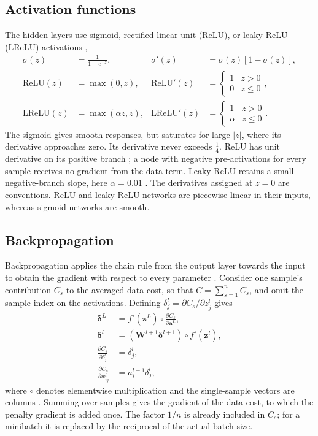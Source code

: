 \documentclass[aps,prb,reprint,superscriptaddress,nofootinbib,longbibliography,floatfix]{revtex4-2}
\begin{document}
\subsection{Activation functions}\label{sec:activation}
The hidden layers use sigmoid, rectified linear unit (ReLU), or leaky ReLU (LReLU) activations \cite[Sec.~8.6]{HjorthJensen2026},
\begin{align}
\sigma(z)&=\frac{1}{1+e^{-z}},
&\sigma'(z)&=\sigma(z)[1-\sigma(z)],\nonumber\\
\mathrm{ReLU}(z)&=\max(0,z),
&\mathrm{ReLU}'(z)&=\begin{cases}1&z>0\\0&z\le0\end{cases},\nonumber\\
\mathrm{LReLU}(z)&=\max(\alpha z,z),
&\mathrm{LReLU}'(z)&=\begin{cases}1&z>0\\\alpha&z\le0\end{cases}.
\label{eq:activations}
\end{align}
The sigmoid gives smooth responses, but saturates for large $|z|$, where its derivative approaches zero. Its derivative never exceeds $\frac14$. ReLU has unit derivative on its positive branch \cite{Nair2010}; a node with negative pre-activations for every sample receives no gradient from the data term. Leaky ReLU retains a small negative-branch slope, here $\alpha=0.01$ \cite{Maas2013}. The derivatives assigned at $z=0$ are conventions. ReLU and leaky ReLU networks are piecewise linear in their inputs, whereas sigmoid networks are smooth.

\subsection{Backpropagation}\label{sec:backprop}
Backpropagation applies the chain rule from the output layer towards the input to obtain the gradient with respect to every parameter \cite[Sec.~8.8]{HjorthJensen2026}. Consider one sample's contribution $C_s$ to the averaged data cost, so that $C=\sum_{s=1}^n C_s$, and omit the sample index on the activations. Defining $\delta_j^l=\partial C_s/\partial z_j^l$ gives
\begin{align}
\bm\delta^L&=f'\!\left(\bm z^L\right)\circ
\frac{\partial C_s}{\partial\bm a^L},\label{eq:bp1}\\
\bm\delta^l&=\left(\bm W^{l+1}\bm\delta^{l+1}\right)
\circ f'\!\left(\bm z^l\right),\label{eq:bp2}\\
\frac{\partial C_s}{\partial b_j^l}&=\delta_j^l,\label{eq:bp3}\\
\frac{\partial C_s}{\partial w_{ij}^l}&=a_i^{l-1}\delta_j^l,
\label{eq:bp4}
\end{align}
where $\circ$ denotes elementwise multiplication and the single-sample vectors are columns \cite[Sec.~8.8.4]{HjorthJensen2026}. Summing over samples gives the gradient of the data cost, to which the penalty gradient is added once. The factor $1/n$ is already included in $C_s$; for a minibatch it is replaced by the reciprocal of the actual batch size.
\end{document}
